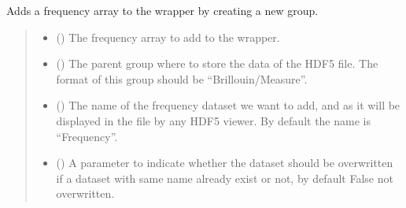 \documentclass[letterpaper,10pt,english]{sphinxmanual}
\begin{document}
\begin{fulllineitems}
\begin{fulllineitems}
\begin{quote}
\begin{description}
\end{description}\end{quote}

\end{fulllineitems}


\begin{fulllineitems}
\label{\detokenize{source/HDF5_BLS:HDF5_BLS.wrapper.Wrapper.add_frequency}}
\pysigstartsignatures
\pysiglinewithargsret
{}
{\sphinxparamcomma {}\sphinxparamcomma {}\sphinxparamcomma {}}
{}
\pysigstopsignatures
\sphinxAtStartPar
Adds a frequency array to the wrapper by creating a new group.
\begin{quote}\begin{description}
\begin{itemize}
\item {} 
\sphinxAtStartPar
{} () \textendash{} The frequency array to add to the wrapper.

\item {} 
\sphinxAtStartPar
{} (\sphinxstyleliteralemphasis{\sphinxupquote{, }}) \textendash{} The parent group where to store the data of the HDF5 file. The format of this group should be “Brillouin/Measure”.

\item {} 
\sphinxAtStartPar
{} (\sphinxstyleliteralemphasis{\sphinxupquote{, }}) \textendash{} The name of the frequency dataset we want to add, and as it will be displayed in the file by any HDF5 viewer. By default the name is “Frequency”.

\item {} 
\sphinxAtStartPar
{} (\sphinxstyleliteralemphasis{\sphinxupquote{, }}) \textendash{} A parameter to indicate whether the dataset should be overwritten if a dataset with same name already exist or not, by default False \sphinxhyphen{} not overwritten.


\end{itemize}
\end{description}
\end{quote}
\end{fulllineitems}
\end{fulllineitems}
\end{document}
